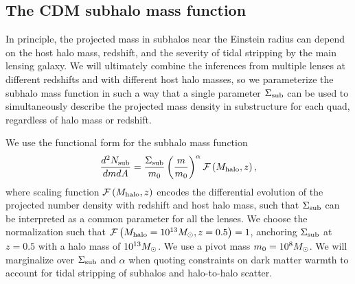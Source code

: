 \subsection{The CDM subhalo mass function}
\label{ssec:submfunc}
In principle, the projected mass in subhalos near the Einstein radius can depend on the host halo mass, redshift, and the severity of tidal stripping by the main lensing galaxy. We will ultimately combine the inferences from multiple lenses at different redshifts and with different host halo masses, so we parameterize the subhalo mass function in such a way that a single parameter $\Sigma_{\rm{sub}}$ can be used to simultaneously describe the projected mass density in substructure for each quad, regardless of halo mass or redshift. 

We use the functional form for the subhalo mass function
\begin{equation}
\label{eqn:subhalomfunc}
\frac{d^2 N_{\rm{sub}}}{dm dA} =  \frac{\Sigma_{\rm{sub}}}{m_0} \left(\frac{m}{m_0}\right)^{\alpha} \mathcal{F} \left(M_{\rm{halo}}, z\right),
\end{equation}
where scaling function $\mathcal{F} \left(M_{\rm{halo}}, z\right)$ encodes the differential evolution of the projected number density with redshift and host halo mass, such that $\Sigma_{\rm{sub}}$ can be interpreted as a common parameter for all the lenses. We choose the normalization such that $\mathcal{F} \left(M_{\rm{halo}} = 10^{13} {M_{\odot}}, z = 0.5\right) = 1$, anchoring $\Sigma_{\rm{sub}}$ at $z=0.5$ with a halo mass of $10^{13}{M_{\odot}}$. We use a pivot mass $m_0 = 10^8 {M_{\odot}}$. We will marginalize over $\Sigma_{\rm{sub}}$ and $\alpha$ when quoting constraints on dark matter warmth to account for tidal stripping of subhalos and halo-to-halo scatter.  

